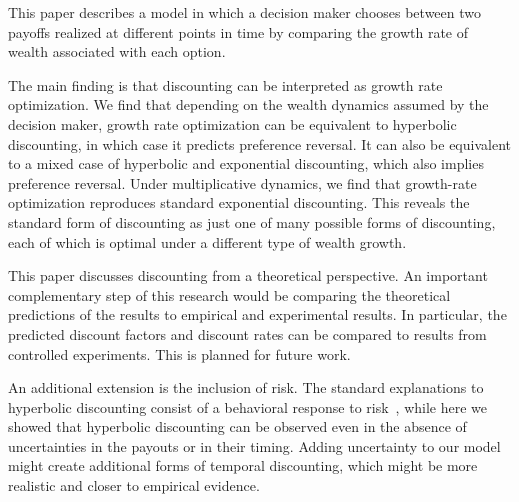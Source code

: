 \documentclass[11pt]{article}
\numberwithin{equation}{section}
\begin{document}
This paper describes a model in which a decision maker chooses between two payoffs realized at different points in time by comparing the growth rate of wealth associated with each option.

The main finding is that discounting can be interpreted as growth rate optimization. We find that depending on the wealth dynamics assumed by the decision maker, growth rate optimization can be equivalent to hyperbolic discounting, in which case it predicts preference reversal. It can also be equivalent to a mixed case of hyperbolic and exponential discounting, which also implies preference reversal. Under multiplicative dynamics, we find that growth-rate optimization reproduces standard exponential discounting. This reveals the standard form of discounting as just one of many possible forms of discounting, each of which is optimal under a different type of wealth growth.



This paper discusses discounting from a theoretical perspective. An important complementary step of this research would be comparing the theoretical predictions of the results to empirical and experimental results. In particular, the predicted discount factors and discount rates can be compared to results from controlled experiments. This is planned for future work.

An additional extension is the inclusion of risk. The standard explanations to hyperbolic discounting consist of a behavioral response to risk~\citep{sozou1998hyperbolic,dasgupta2005uncertainty}, while here we showed that hyperbolic discounting can be observed even in the absence of uncertainties in the payouts or in their timing. Adding uncertainty to our model might create additional forms of temporal discounting, which might be more realistic and closer to empirical evidence.
\end{document}
